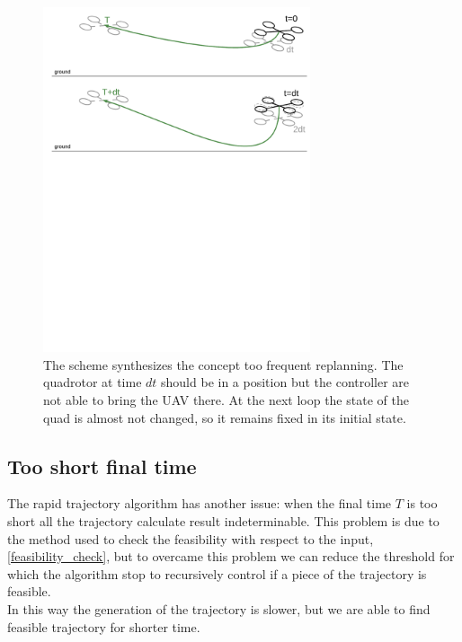\begin{figure}[!htbp]
    \centering
    \includegraphics[width=0.7\textwidth]{img/frequent_replanning.pdf}
    \caption{The scheme synthesizes the concept too frequent replanning. The quadrotor at time $dt$ should be in a position but the controller are not able to bring the UAV there. At the next loop the state of the quad is almost not changed, so it remains fixed in its initial state.}
    \label{fig:freq_replan}
\end{figure}


\subsection{Too short final time}
The rapid trajectory algorithm has another issue: when the final time $T$ is too short all the trajectory calculate result indeterminable. This problem is due to the method used to check the feasibility with respect 
to the input, \ref{feasibility_check}, but to overcame this problem we can reduce the threshold for which the algorithm stop to recursively control if a piece of the trajectory is feasible.\\
In this way the generation of the trajectory is slower, but we are able to find feasible trajectory for shorter time.

